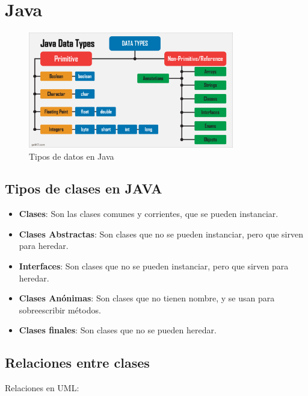 \documentclass[../main.tex]{subfiles}
\begin{document}
\section{Java} 
    \begin{figure}[h]
        \centering
        \includegraphics[width=0.8\textwidth]{../images/tipos_datos.png}
        \caption{Tipos de datos en Java \cite{tipos_de_datos_primitivos}}
        \label{fig:java}
    \end{figure}

    \subsection{Tipos de clases en JAVA}
        \begin{itemize}
            \item \textbf{Clases}: Son las clases comunes y corrientes, que se pueden instanciar.
            \item \textbf{Clases Abstractas}: Son clases que no se pueden instanciar, pero que sirven para heredar.
            \item \textbf{Interfaces}: Son clases que no se pueden instanciar, pero que sirven para heredar.
            \item \textbf{Clases Anónimas}: Son clases que no tienen nombre, y se usan para sobreescribir métodos.
            \item \textbf{Clases finales}: Son clases que no se pueden heredar.
        \end{itemize}

    \subsection{Relaciones entre clases}
        Relaciones en UML: \cite{uml_relacion_clases}
\end{document}
